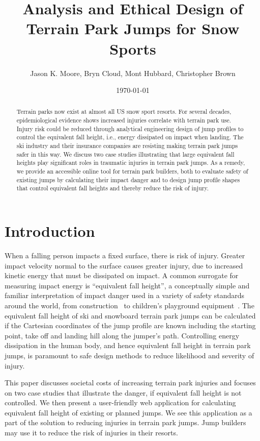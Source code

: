 \documentclass{article}
\title{Analysis and Ethical Design of Terrain Park Jumps for Snow Sports}
\author{Jason K. Moore, Bryn Cloud, Mont Hubbard, Christopher Brown}
\date{\today}
\begin{document}
\maketitle

\begin{abstract}
  Terrain parks now exist at almost all US snow sport resorts. For several
  decades, epidemiological evidence shows increased injuries correlate with
  terrain park use. Injury risk could be reduced through analytical engineering
  design of jump profiles to control the equivalent fall height, i.e., energy
  dissipated on impact when landing. The ski industry and their insurance
  companies are resisting making terrain park jumps safer in this way. We
  discuss two case studies illustrating that large equivalent fall heights play
  significant roles in traumatic injuries in terrain park jumps. As a remedy,
  we provide an accessible online tool for terrain park builders, both to
  evaluate safety of existing jumps by calculating their impact danger and to
  design jump profile shapes that control equivalent fall heights and thereby
  reduce the risk of injury.
\end{abstract}

\section{Introduction}
%
When a falling person impacts a fixed surface, there is risk of injury. Greater
impact velocity normal to the surface causes greater injury, due to increased
kinetic energy that must be dissipated on impact. A common surrogate for
measuring impact energy is ``equivalent fall height'', a conceptually simple
and familiar interpretation of impact danger used in a variety of safety
standards around the world, from construction~\cite{OSHA2021} to children's
playground equipment~\cite{Chalmers1996}. The equivalent fall height of ski and
snowboard terrain park jumps can be calculated~\cite{McNeil2012} if the Cartesian coordinates of
the jump profile are known including  the starting point, take off and
landing hill along the jumper's path. Controlling energy
dissipation in the human body, and hence equivalent fall height in terrain
park jumps, is paramount to safe design methods to reduce likelihood and
severity of injury.

This paper discusses societal costs of increasing terrain park injuries and
focuses on two case studies that illustrate the danger, if equivalent fall
height is not controlled. We then present a user-friendly web application for
calculating equivalent fall height of existing or planned jumps. We see this
application as a part of the solution to reducing injuries in terrain park
jumps. Jump builders may use it to reduce the risk of injuries in their
resorts.
\end{document}
